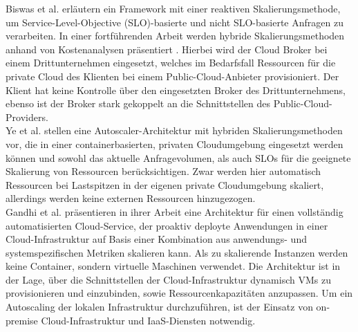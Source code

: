 \documentclass[runningheads]{llncs}
\begin{document}
Biswas et al. \cite{biswas_auto-scaling_2015} erläutern ein Framework mit einer reaktiven Skalierungsmethode, um Service-Level-Objective (SLO)-basierte und nicht SLO-basierte Anfragen zu verarbeiten. In einer fortführenden Arbeit werden hybride Skalierungsmethoden anhand von Kostenanalysen präsentiert \cite{biswas_hybrid_2017}. Hierbei wird der Cloud Broker bei einem Drittunternehmen eingesetzt, welches im Bedarfsfall Ressourcen für die private Cloud des Klienten bei einem Public-Cloud-Anbieter provisioniert. Der Klient hat keine Kontrolle über den eingesetzten Broker des Drittunternehmens, ebenso ist der Broker stark gekoppelt an die Schnittstellen des Public-Cloud-Providers. \\
	
Ye et al. \cite{ye_auto-scaling_2017} stellen eine Autoscaler-Architektur mit hybriden Skalierungsmethoden vor, die in einer containerbasierten, privaten Cloudumgebung eingesetzt werden können und sowohl das aktuelle Anfragevolumen, als auch SLOs für die geeignete Skalierung von Ressourcen berücksichtigen. Zwar werden hier automatisch Ressourcen bei Lastspitzen in der eigenen private Cloudumgebung skaliert, allerdings werden  keine externen Ressourcen hinzugezogen. \\

Gandhi et al. \cite{gandhi_adaptive_nodate} präsentieren in ihrer Arbeit eine Architektur für einen voll\-ständig automatisierten Cloud-Service, der proaktiv deployte Anwendungen in einer Cloud-Infrastruktur auf Basis einer Kombination aus anwendungs- und systemspezifischen Metriken skalieren kann. Als zu skalierende Instanzen werden keine Container, sondern virtuelle Maschinen verwendet. Die Architektur ist in der Lage, über die Schnittstellen der Cloud-Infrastruktur dynamisch VMs zu provisionieren und einzubinden, sowie Ressourcenkapazitäten anzupassen. Um ein Autoscaling der lokalen Infrastruktur durchzuführen, ist der Einsatz von on-premise Cloud-Infrastruktur und IaaS-Diensten notwendig. \\
	
\end{document}
